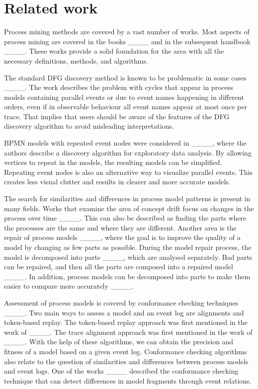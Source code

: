 \section{Related work}
\label{sec:related}

Process mining methods are covered by a vast number of works. 
Most aspects of process mining are covered in the books ____ and in the subsequent handbook ____. These works provide a solid foundation for the area with all the necessary definitions, methods, and algorithms.

The standard DFG discovery method is known to be problematic in some cases ____. The work describes the problem with cycles that appear in process models containing parallel events or due to event names happening in different orders, even if in observable behaviour all event names appear at most once per trace. That implies that users should be aware of the features of the DFG discovery algorithm to avoid misleading interpretations.

BPMN models with repeated event nodes were considered in ____, where the authors describe a discovery algorithm for exploratory data analysis. By allowing vertices to repeat in the models, the resulting models can be simplified. Repeating event nodes is also an alternative way to visualize parallel events. This creates less visual clutter and results in clearer and more accurate models.

The search for similarities and differences in process model patterns is present in many fields. Works that examine the area of concept drift focus on changes in the process over time ____. This can also be described as finding the parts where the processes are the same and where they are different. Another area is the repair of process models ____, where the goal is to improve the quality of a model by changing as few parts as possible. During the model repair process, the model is decomposed into parts ____, which are analysed separately. 
Bad parts can be repaired, and then all the parts are composed into a repaired model ____. 
In addition, process models can be decomposed into parts to make them easier to compare more accurately ____.

Assessment of process models is covered by conformance checking techniques ____. Two main ways to assess a model and an event log are alignments and token-based replay. The token-based replay approach was first mentioned in the work of ____. The trace alignment approach was first mentioned in the work of ____. With the help of these algorithms, we can obtain the precision and fitness of a model based on a given event log. Conformance checking algorithms also relate to the question of similarities and differences between process models and event logs. One of the works ____ described the conformance checking technique that can detect differences in model fragments through event relations. 

